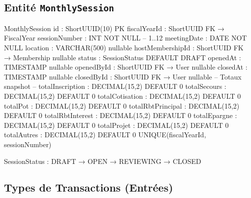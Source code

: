 \documentclass[12pt, a4paper]{report}
\begin{document}
\subsection{Entité \texttt{MonthlySession}}

\begin{codeBox}
MonthlySession {
  id                : ShortUUID(10)   PK
  fiscalYearId      : ShortUUID       FK → FiscalYear
  sessionNumber     : INT             NOT NULL  -- 1..12
  meetingDate       : DATE            NOT NULL
  location          : VARCHAR(500)    nullable
  hostMembershipId  : ShortUUID FK → Membership  nullable
  status            : SessionStatus   DEFAULT DRAFT
  openedAt          : TIMESTAMP       nullable
  openedById        : ShortUUID FK → User  nullable
  closedAt          : TIMESTAMP       nullable
  closedById        : ShortUUID FK → User  nullable
  -- Totaux snapshot --
  totalInscription  : DECIMAL(15,2)   DEFAULT 0
  totalSecours      : DECIMAL(15,2)   DEFAULT 0
  totalCotisation   : DECIMAL(15,2)   DEFAULT 0
  totalPot          : DECIMAL(15,2)   DEFAULT 0
  totalRbtPrincipal : DECIMAL(15,2)   DEFAULT 0
  totalRbtInterest  : DECIMAL(15,2)   DEFAULT 0
  totalEpargne      : DECIMAL(15,2)   DEFAULT 0
  totalProjet       : DECIMAL(15,2)   DEFAULT 0
  totalAutres       : DECIMAL(15,2)   DEFAULT 0
  UNIQUE(fiscalYearId, sessionNumber)
}

SessionStatus : DRAFT → OPEN → REVIEWING → CLOSED
\end{codeBox}

\subsection{Types de Transactions (Entrées)}
\end{document}
